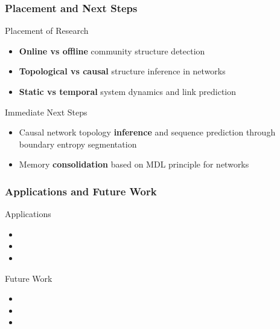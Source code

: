 \begin{frame}
  \frametitle{Placement and Next Steps}
  \begin{block}{Placement of Research}
    \begin{itemize}
      \item \textbf{Online vs offline} community structure detection 
      \item \textbf{Topological vs causal} structure inference in networks
      \item \textbf{Static vs temporal} system dynamics and link prediction 
    \end{itemize}
  \end{block}
  \begin{block}{Immediate Next Steps}
    \begin{itemize}
      \item Causal network topology \textbf{inference} and sequence prediction through boundary entropy segmentation
      \item Memory \textbf{consolidation} based on MDL principle for networks
    \end{itemize}
  \end{block}
\end{frame}

\begin{frame}
  \frametitle{Applications and Future Work}
  \begin{block}{Applications}
    \begin{itemize}
      \item 
      \item 
      \item 
    \end{itemize}
  \end{block}
  \begin{block}{Future Work}
    \begin{itemize}
      \item 
      \item
      \item
    \end{itemize}
  \end{block}
\end{frame}
